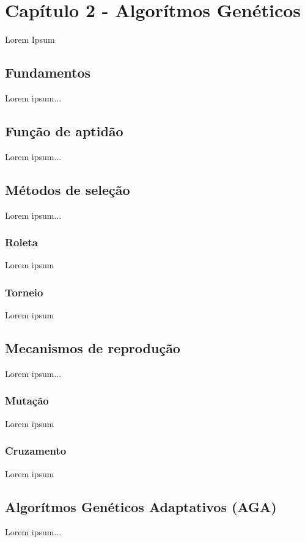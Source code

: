 
\newpage
\section{Capítulo 2 - Algorítmos Genéticos}
\label{sec:capitulo_2}
Lorem Ipsum

\subsection{Fundamentos}
\label{sub:fundamentos}
Lorem ipsum...

\subsection{Função de aptidão}
\label{sub:funcao_de_aptidao}
Lorem ipsum...

\subsection{Métodos de seleção}
\label{sub:metodos_de_selecao}
Lorem ipsum...

    \subsubsection{Roleta}
    \label{ssub:roleta}
    Lorem ipsum

    \subsubsection{Torneio}
    \label{ssub:torneio}
    Lorem ipsum

\subsection{Mecanismos de reprodução}
\label{sub:mecanismos_de_reproducao}
Lorem ipsum...

    \subsubsection{Mutação}
    \label{ssub:mutacao}
    Lorem ipsum

    \subsubsection{Cruzamento}
    \label{ssub:cruzamento}
    Lorem ipsum

\subsection{Algorítmos Genéticos Adaptativos (AGA)}
\label{sub:aga}
Lorem ipsum...

